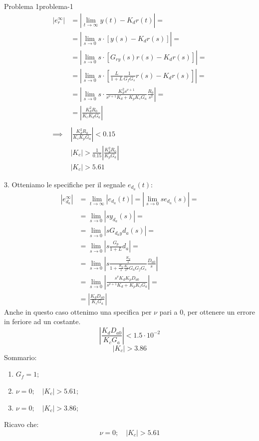 \documentclass[12pt]{article}
\begin{document}
\begin{problem}{Problema 1}{problema-1}
    \begin{align*}
        \left| e_r^{\infty} \right| & = \left|\lim_{t \to \infty}  y(t) - K_dr(t) \right| = \\
        & = |\lim_{s \to 0} s\cdot[y(s) - K_dr(s)]| = \\
        & = |\lim_{s \to 0} s\cdot[G _{ry}(s)r(s) - K_dr(s)]| = \\
        & = \left|\lim_{s \to 0} s\cdot \left[\frac{L}{1+L} \frac{1}{G_fG_s} r(s) - K_dr(s)\right] \right| = \\
        & = \left|\lim_{s \to 0} s\cdot\frac{K_d^{2}s^{\nu + 1}}{s^{\nu + 1}K_d + K_pK_cG_a } \frac{R_0}{s^{2}} \right| = \\
        & = \left| \frac{K_d^{2}R_0}{K_cK_dG_a}  \right|  \\
        \\
        \implies & \left| \frac{K_d^{2} R_0}{ K_c K_p G_a} \right|  < 0.15 \\
        & \left| K_c \right| > \frac{1}{0.15} \left| \frac{K_d^{2} R_0}{ K_p G_a} \right|  \\
        & \left| K_c \right|  > 5.61 
    \end{align*}

    3. Otteniamo le specifiche per il segnale $e _{d_a}(t)$:
    \begin{align*}
        \left| e _{d_a}^{\infty} \right| & = \lim_{t \to \infty} |e _{d_a}(t)| =| \lim_{s \to 0}  s e _{d_a}(s)| = \\
        & = \lim_{s \to 0}  |s y _{d_a}(s)| = \\
        & = \lim_{s \to 0} | s G _{d_ay} d_a(s) | = \\
        & = \lim_{s \to 0} \left| s \frac{G_p}{1 + L} d_a  \right|  = \\
        & = \lim_{s \to 0} \left|  s \frac{\frac{K_p}{s} }{1  +\frac{K_p}{s} \frac{K_c}{s^{\nu}} G_aG_fG_s } \frac{D_{a0}}{s}  \right| \\
        & = \lim_{s \to 0} \left|  \frac{s^{\nu}K_dK_pD_{a0}}{s^{\nu+1}K_d + K_pK_cG_a} \right| = \\
        & = \left| \frac{K_dD _{a0}}{K_cG_a}  \right| 
    \end{align*} 
    Anche in questo caso ottenimo una specifica per $\nu$ pari a 0, per ottenere un errore in feriore ad un costante.
    \[ \left|  \frac{K_d D _{a0}}{K_cG_a} \right| < 1.5 \cdot 10^{-2} \]
    \[ \left| K_c \right|  > 3.86 \]
    Sommario:
    \begin{enumerate}
        \item $G_f = 1$;
        \item $\nu = 0;\quad |K_c| > 5.61$;
        \item $\nu = 0;\quad |K_c| > 3.86$;
    \end{enumerate}
    Ricavo che:
    \[ \boxed{\nu = 0;\quad |K_c| > 5.61} \]
    
\end{problem}
\end{document}
